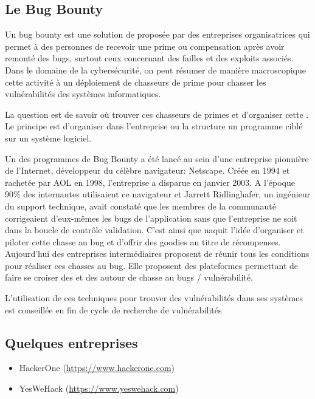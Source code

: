 
\subsection{Le Bug Bounty}

Un bug bounty est une solution de  proposée par des entreprises organisatrices qui permet à des personnes de recevoir une prime ou compensation après avoir remonté des bugs, surtout ceux concernant des failles et des exploits associés. Dans le domaine de la cybersécurité, on peut résumer de manière macroscopique cette activité  à un déploiement de chasseurs de prime pour chasser les vulnérabilités  des systèmes informatiques.

La question est de savoir où trouver ces chasseurs de primes et d'organiser cette . Le principe est d'organiser dans l'entreprise ou la structure un programme ciblé sur un système logiciel.

Un des programmes de Bug Bounty  a été lancé au sein d’une entreprise pionnière de l'Internet, développeur du célèbre navigateur: Netscape. Créée en 1994 et rachetée par AOL en 1998, l’entreprise a disparue en janvier 2003.
A l'époque 90\% des internautes utilisaient ce navigateur et Jarrett Ridlinghafer, un ingénieur du support technique, avait constaté que les membres de la communauté  corrigeaient d’eux-mêmes les bugs de l'application sans que l'entreprise ne soit dans la boucle de contrôle validation. C'est ainsi que naquit l'idée d'organiser et piloter cette chasse au bug et d'offrir des goodies au titre de récompenses. 
Aujourd'hui des entreprises intermédiaires proposent de réunir tous les conditions pour réaliser ces chasses au bug.
Elle proposent des plateformes permettant de faire se croiser des  et des  autour de chasse au bugs / vulnérabilité.

L'utilisation de ces techniques pour trouver des vulnérabilités dans ses systèmes est conseillée en fin de cycle de recherche de vulnérabilités

\subsection{Quelques entreprises}

\begin{itemize}
    \item HackerOne (\url{https://www.hackerone.com})
    \item YesWeHack (\url{https://www.yeswehack.com})
\end{itemize}



